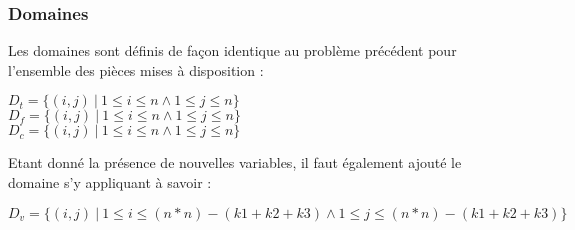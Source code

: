 \documentclass[a4paper]{article}
\begin{document}
\subsubsection{Domaines}
Les domaines sont définis de façon identique au problème précédent pour l'ensemble des pièces mises à disposition : 
\begin{center}
$D_t = \{ (i,j) \ | \ 1 \leq i \leq n \wedge 1 \leq j \leq n \}$ \\
$D_f = \{ (i,j) \ | \ 1 \leq i \leq n \wedge 1 \leq j \leq n \}$ \\
$D_c = \{ (i,j) \ | \ 1 \leq i \leq n \wedge 1 \leq j \leq n \}$ \\
\end{center}
Etant donné la présence de nouvelles variables, il faut également ajouté le domaine s'y appliquant à savoir : 
\begin{center}
$D_v = \{ (i,j) \ | \ 1 \leq i \leq (n*n)-(k1+k2+k3) \wedge 1 \leq j \leq (n*n)-(k1+k2+k3) \}$
\end{center}
\end{document}
